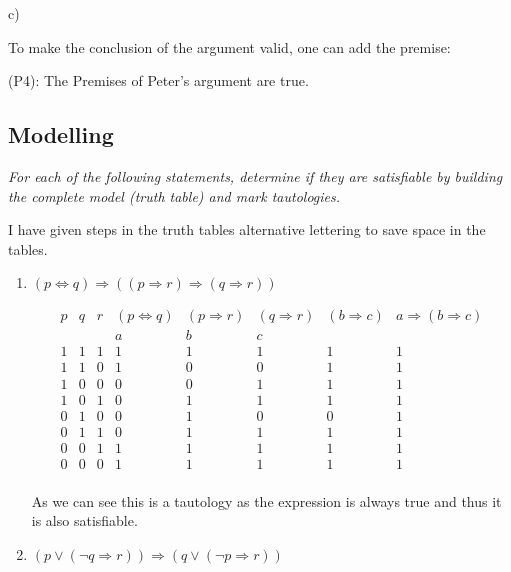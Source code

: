 c) 

To make the conclusion of the argument valid, one can add the premise: 

(P4): The Premises of Peter's argument are true. 

\subsection{Modelling}

\textit{For each of the following statements, determine if they are satisfiable by building the complete model
(truth table) and mark tautologies.}

I have given steps in the truth tables alternative lettering to save space in the tables. 

\begin{enumerate}[label=\alph*)]
    \item $ (p \Longleftrightarrow q) \Longrightarrow ((p \Longrightarrow r) \Longrightarrow (q \Longrightarrow r)) $ 
    
        \[
            \begin{array}{cccccccc}  
                \hline
                p & q & r & (p \Longleftrightarrow q) & (p \Longrightarrow r) & (q \Longrightarrow r) & (b \Longrightarrow c) & a \Longrightarrow (b \Longrightarrow c) \\
                & & & a & b & c & & \\
                \hline
                1 & 1 & 1 & 1 & 1 & 1 & 1 & 1 \\
                1 & 1 & 0 & 1 & 0 & 0 & 1 & 1 \\
                1 & 0 & 0 & 0 & 0 & 1 & 1 & 1 \\
                1 & 0 & 1 & 0 & 1 & 1 & 1 & 1 \\
                0 & 1 & 0 & 0 & 1 & 0 & 0 & 1 \\
                0 & 1 & 1 & 0 & 1 & 1 & 1 & 1 \\
                0 & 0 & 1 & 1 & 1 & 1 & 1 & 1 \\
                0 & 0 & 0 & 1 & 1 & 1 & 1 & 1 \\
            \end{array}
        \]
        

        As we can see this is a tautology as the expression is always true and thus it is also satisfiable. 
    \item $ (p \lor (\neg q \Longrightarrow r)) \Longrightarrow (q \lor (\neg p \Longrightarrow r)) $
    

\end{enumerate}
